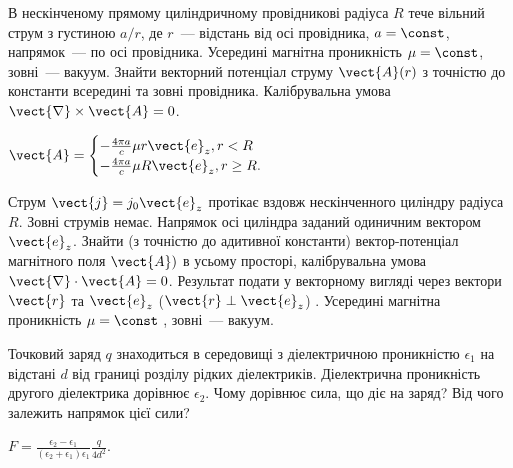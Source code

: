 \begin{problem}
В нескінченому прямому циліндричному провідникові радіуса $R$ тече вільний струм з густиною $a/r$, де $r$~--- відстань від осі провідника, $a = \const$, напрямок~--- по осі провідника. Усередині магнітна проникність $\mu = \const$, зовні~--- вакуум. Знайти векторний потенціал струму $\vect{A}(r)$  з точністю до константи всередині та зовні провідника. Калібрувальна умова $\vect{\nabla}\times\vect{A} = 0$.
\begin{solution}
	$\vect{A} =
		\begin{cases}
			-\frac{4\pi a}{c}\mu r \vect{e}_z, r < R \\
			-\frac{4\pi a}{c}\mu R \vect{e}_z, r \ge R.
		\end{cases}
	$
\end{solution}
\end{problem}

\begin{problem}
Струм  $\vect{j} = j_0 \vect{e}_z$ протікає вздовж нескінченного циліндру радіуса $R$. Зовні струмів
немає. Напрямок осі циліндра заданий одиничним вектором  $\vect{e}_z$. Знайти (з точністю до адитивної
константи) вектор-потенціал магнітного поля $\vect{A})$  в усьому просторі, калібрувальна умова
$\vect{\nabla}\cdot\vect{A} = 0$. Результат подати у векторному вигляді через вектори $\vect{r}$ та
$\vect{e}_z$ ($\vect{r} \perp \vect{e}_z$) . Усередині магнітна проникність $\mu = \const$  ,
зовні~--- вакуум.
\end{problem}

\begin{problem}
Точковий заряд $q$ знаходиться в середовищі з діелектричною проникністю $\epsilon_1$ на відстані $d$ від границі розділу рідких діелектриків. Діелектрична проникність другого діелектрика дорівнює $\epsilon_2$. Чому дорівнює сила, що діє на заряд? Від чого залежить напрямок цієї сили?
\begin{solution}
	$F = \frac{\epsilon_2 - \epsilon_1}{(\epsilon_2 + \epsilon_1)\epsilon_1} \frac{q}{4d^2}$.
\end{solution}
\end{problem}

